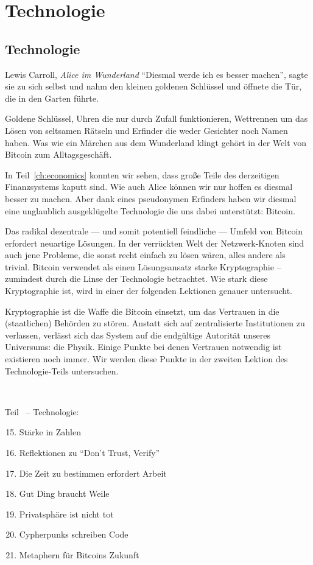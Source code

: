 \part{Technologie}
\label{ch:technology}
\chapter*{Technologie}

\begin{chapquote}{Lewis Carroll, \textit{Alice im Wunderland}}
\enquote{Diesmal werde ich es besser machen}, sagte sie zu sich selbst und nahm
den kleinen goldenen Schlüssel und öffnete die Tür, die in den Garten führte.
\end{chapquote}

Goldene Schlüssel, Uhren die nur durch Zufall funktionieren, Wettrennen um das
Lösen von seltsamen Rätseln und Erfinder die weder Gesichter noch Namen haben.
Was wie ein Märchen aus dem Wunderland klingt gehört in der Welt von Bitcoin zum
Alltagsgeschäft.

In Teil~\ref{ch:economics} konnten wir sehen, dass große Teile des derzeitigen
Finanzsystems kaputt sind. Wie auch Alice können wir nur hoffen es diesmal
besser zu machen. Aber dank eines pseudonymen Erfinders haben wir diesmal eine
unglaublich ausgeklügelte Technologie die uns dabei unterstützt: Bitcoin.

Das radikal dezentrale --- und somit potentiell feindliche --- Umfeld von
Bitcoin  erfordert neuartige Lösungen. In der verrückten Welt der
Netzwerk-Knoten sind auch jene Probleme, die sonst recht einfach zu lösen wären,
alles andere als trivial. Bitcoin verwendet als einen Lösungsansatz starke
Kryptographie – zumindest durch die Linse der Technologie betrachtet. Wie stark
diese Kryptographie ist, wird in einer der folgenden Lektionen genauer
untersucht.

Kryptographie ist die Waffe die Bitcoin einsetzt, um das Vertrauen in die
(staatlichen) Behörden zu stören. Anstatt sich auf zentralisierte Institutionen
zu verlassen, verlässt sich das System auf die endgültige Autorität unseres
Universums: die Physik. Einige Punkte bei denen Vertrauen notwendig ist
existieren noch immer. Wir werden diese Punkte in der zweiten Lektion des
Technologie-Teils untersuchen.

~

\begin{samepage}
Teil~\ref{ch:technology} -- Technologie:

\begin{enumerate}
  \setcounter{enumi}{14}
  \item Stärke in Zahlen
  \item Reflektionen zu \enquote{Don't Trust, Verify}
  \item Die Zeit zu bestimmen erfordert Arbeit
  \item Gut Ding braucht Weile
  \item Privatsphäre ist nicht tot
  \item Cypherpunks schreiben Code
  \item Metaphern für Bitcoins Zukunft
\end{enumerate}
\end{samepage}

